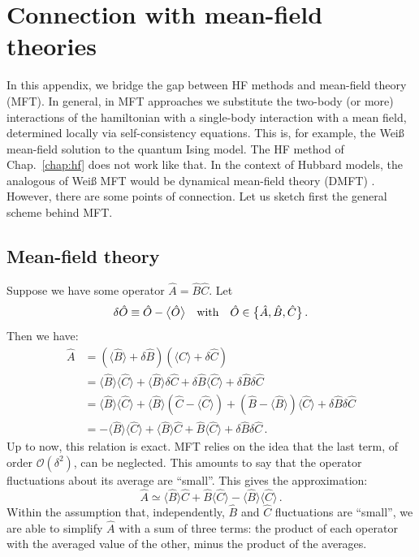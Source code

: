 \chapter{Connection with mean-field theories}\label{app:hf-mft}

In this appendix, we bridge the gap between HF methods and mean-field theory (MFT). In general, in MFT approaches we substitute the two-body (or more) interactions of the hamiltonian with a single-body interaction with a mean field, determined locally via self-consistency equations. This is, for example, the Weiß mean-field solution to the quantum Ising model. The HF method of Chap.~\ref{chap:hf} does not work like that. In the context of Hubbard models, the analogous of Weiß MFT would be dynamical mean-field theory (DMFT) \cite{georges1996dynamical}. However, there are some points of connection. Let us sketch first the general scheme behind MFT. 

\section{Mean-field theory}

Suppose we have some operator $\hat A = \hat B \hat C$. Let
\[
\delta \hat O \equiv \hat O - \big\langle \hat O \big\rangle
\qq{with}
\hat O \in \big\lbrace \hat A, \hat B, \hat C \big\rbrace \, .
\]
Then we have:
\[
\begin{aligned}
	\hat A &= \left( \big\langle \hat B \big\rangle + \delta \hat B \right) \left( \big\langle \hat C \big\rangle + \delta \hat C \right) \\
	&= \big\langle \hat B \big\rangle \big\langle \hat C \big\rangle + \big\langle \hat B \big\rangle \delta \hat C + \delta \hat B \big\langle \hat C \big\rangle + \delta \hat B \delta \hat C \\
	&= \big\langle \hat B \big\rangle \big\langle \hat C \big\rangle + \big\langle \hat B \big\rangle \left( \hat C - \big\langle \hat C \big\rangle \right) + \left( \hat B - \big\langle \hat B \big\rangle \right) \big\langle \hat C \big\rangle + \delta \hat B \delta \hat C \\
	&= - \big\langle \hat B \big\rangle \big\langle \hat C \big\rangle + \big\langle \hat B \big\rangle \hat C + \hat B \big\langle \hat C \big\rangle + \delta \hat B \delta \hat C \, .
\end{aligned}
\]
Up to now, this relation is exact. MFT relies on the idea that the last term, of order $\mathcal{O}(\delta^2)$, can be neglected. This amounts to say that the operator fluctuations about its average are ``small''. This gives the approximation:
\begin{equation}\label{appeq:mft-A=BC}
	\hat A \simeq \big\langle \hat B \big\rangle \hat C + \hat B \big\langle \hat C \big\rangle - \big\langle \hat B \big\rangle \big\langle \hat C \big\rangle \, .
\end{equation}
Within the assumption that, independently, $\hat B$ and $\hat C$ fluctuations are ``small'', we are able to simplify $\hat A$ with a sum of three terms: the product of each operator with the averaged value of the other, minus the product of the averages.

